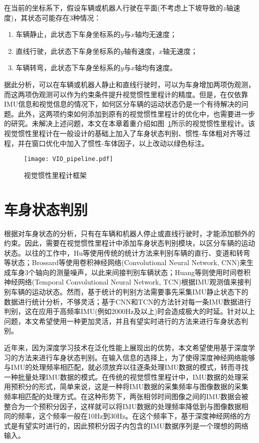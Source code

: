在当前的坐标系下，假设车辆或机器人行驶在平面(不考虑上下坡导致的$z$轴速度)，其状态可能存在3种情况：
\begin{enumerate}
  \item 车辆静止，此状态下车身坐标系的$y$与$x$轴均无速度；
  \item 直线行驶，此状态下车身坐标系的$y$轴有速度，$x$轴无速度；
  \item 车辆转弯，此状态下车身坐标系的$y$与$x$轴均有速度。
\end{enumerate}

据此分析，可以在车辆或机器人静止和直线行驶时，可以为车身增加两项伪观测，而这两项伪观测可以作为约束条件提升视觉惯性里程计的精度。但是，在仅依靠IMU信息和视觉信息的情况下，如何区分车辆的运动状态仍是一个有待解决的问题。此外，这两项约束如何添加到原有的视觉惯性里程计的优化中，也需要进一步的研究。未解决上述问题，本文在本章着重介绍如图~\ref{fig:vio_pipeline}所示的视觉惯性里程计。该视觉惯性里程计在一般设计的基础上加入了车身状态判别、惯性-车体粗对齐等过程，并在窗口优化中加入了惯性-车体因子，以上改动以绿色标注。

\begin{figure}
  \centering
  \texttt{[image: VIO\_pipeline.pdf]}
  \caption{视觉惯性里程计框架}
  \label{fig:vio_pipeline}
\end{figure}

\section{车身状态判别}

根据对车身状态的分析，只有在车辆和机器人停止或直线行驶时，才能添加额外的约束。因此，需要在视觉惯性里程计中添加车身状态判别模块，以区分车辆的运动状态。以往的工作中，Hu等\cite{hu2020memsimu}使用传统的统计方法来判别车辆的直行、变道和转弯等状态；Brossard等\cite{brossard2020ai}使用卷积神经网络(Convolutional Neural Network, CNN)来生成车身3个轴向的测量噪声，以此来间接判别车辆状态；Huang等\cite{huang2022vehicle}则使用时间卷积神经网络(Temporal Convolutional Neural Network, TCN)根据IMU观测值来接判别车辆的运动状态。然而，基于统计的判别方法需要事先采集IMU静止状态下的数据进行统计分析，不够灵活；基于CNN和TCN的方法针对每一条IMU数据进行判别，这在应用于高频率IMU(例如2000Hz及以上)时会造成极大的时延。针对以上问题，本文希望使用一种更加灵活，并且有望实时进行的方法来进行车身状态判别。

近年来，因为深度学习技术在泛化性能上展现出的优势，本文希望使用基于深度学习的方法来进行车身状态判别。在输入信息的选择上，为了使得深度神经网络能够与IMU的处理频率相匹配，就必须放弃以往逐条处理IMU数据的模式，转而寻找一种批量处理IMU数据的模式。在传统的视觉惯性里程计中，IMU数据的处理采用预积分的形式，简单来说，这是一种将IMU数据的采集频率与图像数据的采集频率相匹配的处理方式。在这种形势下，两张相邻时间图像之间的IMU数据会被整合为一个预积分因子，这样就可以将IMU数据的处理频率降低到与图像数据相同的频率，这个频率一般在10Hz到30Hz。在这个频率下，基于深度神经网络的方式是有望实时进行的，因此预积分因子内包含的IMU数据序列是一个理想的网络输入。

